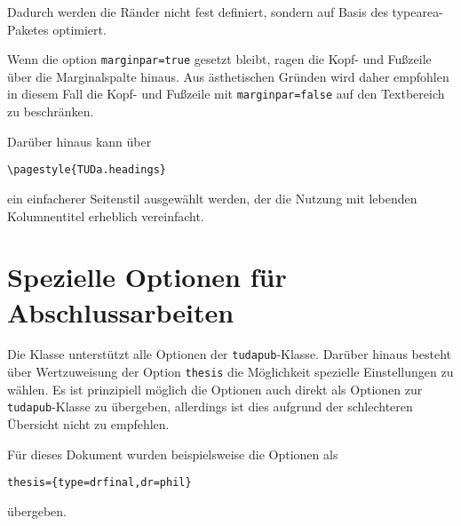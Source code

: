 \documentclass[
	ngerman,
	ruledheaders=section,%
	class=report,%
	thesis={type=bachelor},%
	accentcolor=9c,%
	custommargins=true,%
	marginpar=false,%
	parskip=half-,%
	fontsize=11pt,%
]{tudapub}
\let\file\texttt
\let\code\texttt
\begin{document}
Dadurch werden die Ränder nicht fest definiert, sondern auf Basis des typearea-Paketes optimiert.

Wenn die option \code{marginpar=true} gesetzt bleibt, ragen die Kopf- und Fußzeile über die Marginalspalte hinaus. Aus ästhetischen Gründen wird daher empfohlen in diesem Fall die Kopf- und Fußzeile  mit \code{marginpar=false}  auf den Textbereich zu beschränken.


Darüber hinaus kann über
\begin{verbatim}
\pagestyle{TUDa.headings}
\end{verbatim}
ein einfacherer Seitenstil ausgewählt werden, der die Nutzung mit lebenden Kolumnentitel erheblich vereinfacht.


\section{Spezielle Optionen für Abschlussarbeiten}
Die Klasse unterstützt alle Optionen der \file{tudapub}-Klasse. Darüber hinaus besteht über Wertzuweisung der Option \code{thesis} die Möglichkeit spezielle Einstellungen zu wählen.
Es ist prinzipiell möglich die Optionen auch direkt als Optionen zur \file{tudapub}-Klasse zu übergeben, allerdings ist dies aufgrund der schlechteren Übersicht nicht zu empfehlen.

Für dieses Dokument wurden beispielsweise die Optionen als
\begin{verbatim}
thesis={type=drfinal,dr=phil}
\end{verbatim}
übergeben.
\end{document}
